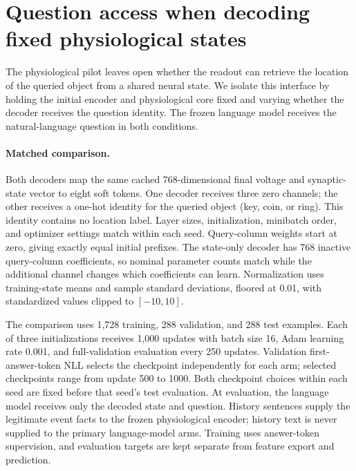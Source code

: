 \section{Question access when decoding fixed physiological states}

\label{app:question-decoder}

The physiological pilot leaves open whether the readout can retrieve the location of the queried object from a shared neural state. We isolate this interface by holding the initial encoder and physiological core fixed and varying whether the decoder receives the question identity. The frozen language model receives the natural-language question in both conditions.

\paragraph{Matched comparison.}

Both decoders map the same cached 768-dimensional final voltage and synaptic-state vector to eight soft tokens. One decoder receives three zero channels; the other receives a one-hot identity for the queried object (key, coin, or ring). This identity contains no location label. Layer sizes, initialization, minibatch order, and optimizer settings match within each seed. Query-column weights start at zero, giving exactly equal initial prefixes. The state-only decoder has 768 inactive query-column coefficients, so nominal parameter counts match while the additional channel changes which coefficients can learn. Normalization uses training-state means and sample standard deviations, floored at 0.01, with standardized values clipped to $[-10,10]$.

The comparison uses 1,728 training, 288 validation, and 288 test examples. Each of three initializations receives 1,000 updates with batch size 16, Adam learning rate 0.001, and full-validation evaluation every 250 updates. Validation first-answer-token NLL selects the checkpoint independently for each arm; selected checkpoints range from update 500 to 1000. Both checkpoint choices within each seed are fixed before that seed's test evaluation. At evaluation, the language model receives only the decoded state and question. History sentences supply the legitimate event facts to the frozen physiological encoder; history text is never supplied to the primary language-model arms. Training uses answer-token supervision, and evaluation targets are kept separate from feature export and prediction.

